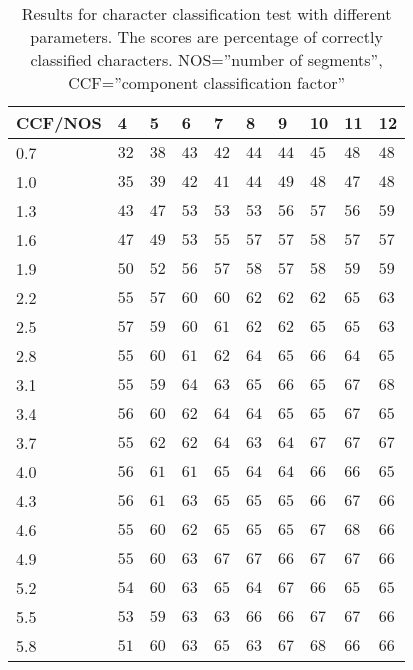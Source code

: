 \begin{table}[htb]
  \begin{center}
  \begin{tabular}{ l | l l l l l l l l l }
CCF/NOS &    4   & 5      & 6      & 7      & 8      & 9      & 10     & 11     & 12 \\ \hline
0.7     &  $32$  &  $38$  &  $43$  &  $42$  &  $44$  &  $44$  &  $45$  &  $48$  &  $48$  \\
1.0     &  $35$  &  $39$  &  $42$  &  $41$  &  $44$  &  $49$  &  $48$  &  $47$  &  $48$  \\
1.3     &  $43$  &  $47$  &  $53$  &  $53$  &  $53$  &  $56$  &  $57$  &  $56$  &  $59$  \\
1.6     &  $47$  &  $49$  &  $53$  &  $55$  &  $57$  &  $57$  &  $58$  &  $57$  &  $57$  \\
1.9     &  $50$  &  $52$  &  $56$  &  $57$  &  $58$  &  $57$  &  $58$  &  $59$  &  $59$  \\
2.2     &  $55$  &  $57$  &  $60$  &  $60$  &  $62$  &  $62$  &  $62$  &  $65$  &  $63$  \\
2.5     &  $57$  &  $59$  &  $60$  &  $61$  &  $62$  &  $62$  &  $65$  &  $65$  &  $63$  \\
2.8     &  $55$  &  $60$  &  $61$  &  $62$  &  $64$  &  $65$  &  $66$  &  $64$  &  $65$  \\
3.1     &  $55$  &  $59$  &  $64$  &  $63$  &  $65$  &  $66$  &  $65$  &  $67$  &  $68$  \\
3.4     &  $56$  &  $60$  &  $62$  &  $64$  &  $64$  &  $65$  &  $65$  &  $67$  &  $65$  \\
3.7     &  $55$  &  $62$  &  $62$  &  $64$  &  $63$  &  $64$  &  $67$  &  $67$  &  $67$  \\
4.0     &  $56$  &  $61$  &  $61$  &  $65$  &  $64$  &  $64$  &  $66$  &  $66$  &  $65$  \\
4.3     &  $56$  &  $61$  &  $63$  &  $65$  &  $65$  &  $65$  &  $66$  &  $67$  &  $66$  \\
4.6     &  $55$  &  $60$  &  $62$  &  $65$  &  $65$  &  $65$  &  $67$  &  $68$  &  $66$  \\
4.9     &  $55$  &  $60$  &  $63$  &  $67$  &  $67$  &  $66$  &  $67$  &  $67$  &  $66$  \\
5.2     &  $54$  &  $60$  &  $63$  &  $65$  &  $64$  &  $67$  &  $66$  &  $65$  &  $65$  \\
5.5     &  $53$  &  $59$  &  $63$  &  $63$  &  $66$  &  $66$  &  $67$  &  $67$  &  $66$  \\
5.8     &  $51$  &  $60$  &  $63$  &  $65$  &  $63$  &  $67$  &  $68$  &  $66$  &  $66$  \\
  \end{tabular}
\end{center}
\caption{Results for character classification test with different parameters. The scores are percentage of correctly classified characters.
	 NOS=''number of segments'',
         CCF=''component classification factor''}
\label{tab:character_classifier_results_different_parameters} 
\end{table}
